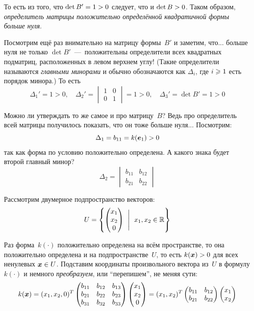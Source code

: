 \documentclass[a4paper,12pt]{article}
\begin{document}
\begin{example}
    То есть из того, что $\det B' \hm= 1 \hm> 0$ следует, что и $\det B \hm> 0$.
    Таком образом, \emph{определитель матрицы положительно определённой квадратичной формы больше нуля}.
    
    Посмотрим ещё раз внимательно на матрицу формы~$B'$ и заметим, что...
    больше нуля не только $\det B'$~---~положительны определители всех квадратных подматриц, расположенных в левом верхнем углу!
    (Такие определители называются \emph{главными минорами} и обычно обозначаются как $\Delta_i$, где $i \hm\geq 1$ есть порядок минора.)
    То есть
    \[
      \Delta_1' = 1 > 0,
      \quad \Delta_2' = \begin{vmatrix}
        1 & 0\\
        0 & 1
      \end{vmatrix} = 1 > 0,
      \quad \Delta_3' = \det B' = 1 > 0
    \]
    
    Можно ли утверждать то же самое и про матрицу~$B$?
    Ведь про определитель всей матрицы получилось показать, что он тоже больше нуля...
    Посмотрим:
    \[
      \Delta_1 = b_{11} = k(\boldsymbol e_1) > 0
    \]
    так как форма по условию положительно определена.
    А какого знака будет второй главный минор?
    \[
      \Delta_2 = \begin{vmatrix}
        b_{11} & b_{12}\\
        b_{21} & b_{22}
      \end{vmatrix}
    \]
    
    Рассмотрим двумерное подпространство векторов:
    \[
      U = \left\{
        \begin{pmatrix}
          x_1\\
          x_2\\
          0
        \end{pmatrix}\ \Biggm|\ x_1, x_2 \in \operatorname{\mathbb R}
      \right\}
    \]
    
    Раз форма~$k(\cdot)$ положительно определена на всём пространстве, то она положительно определена и на подпространстве~$U$, то есть $k(\bds x) \hm> 0$ для всех ненулевых $\bds x \hm\in U$.
    Подставим координаты произвольного вектора из~$U$ в формулу $k(\cdot)$ и немного \emph{преобразуем}, или ``перепишем'', не меняя сути:
    \[
      k(\boldsymbol x)
      = (x_1, x_2, 0)^T \begin{pmatrix}
        b_{11} & b_{12} & b_{13}\\
        b_{21} & b_{22} & b_{23}\\
        b_{31} & b_{32} & b_{33}
      \end{pmatrix} \begin{pmatrix}
        x_1\\
        x_2\\
        0
      \end{pmatrix}
      = (x_1, x_2)^T \begin{pmatrix}
        b_{11} & b_{12}\\
        b_{21} & b_{22}
      \end{pmatrix} \begin{pmatrix}
        x_1\\
        x_2
      \end{pmatrix}
    \]
    

\end{example}
\end{document}
